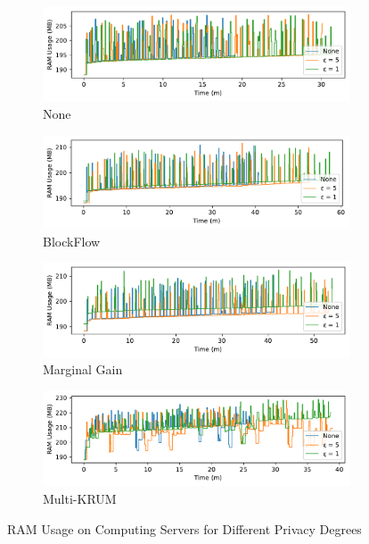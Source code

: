 \begin{figure}[!ht]
    \centering
    \begin{subfigure}[b]{0.49\textwidth}
        \centering
        \includegraphics[width=\textwidth]{graphics/05_priv_ram_none_server.pdf}
        \caption{None}
    \end{subfigure}
    \hfill
    \begin{subfigure}[b]{0.49\textwidth}
        \centering
        \includegraphics[width=\textwidth]{graphics/05_priv_ram_blockflow_server.pdf}
        \caption{BlockFlow}
    \end{subfigure}
    \hfill
    \begin{subfigure}[b]{0.49\textwidth}
        \centering
        \includegraphics[width=\textwidth]{graphics/05_priv_ram_marginalgain_server.pdf}
        \caption{Marginal Gain}
    \end{subfigure}
    \hfill
    \begin{subfigure}[b]{0.49\textwidth}
        \centering
        \includegraphics[width=\textwidth]{graphics/05_priv_ram_multikrum_server.pdf}
        \caption{Multi-KRUM}
    \end{subfigure}
    \caption{RAM Usage on Computing Servers for Different Privacy Degrees}
    \label{fig:ram_priv_degree_server}
\end{figure}


